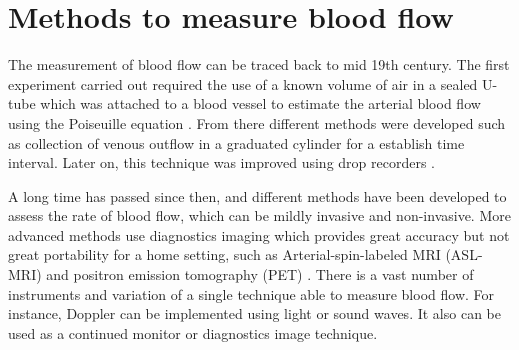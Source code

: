 %


\section{Methods to measure blood flow }
The measurement of blood flow can be traced back to mid 19th century. The first experiment carried out required the use of a known volume of air in a sealed U-tube which was attached to a blood vessel to estimate the arterial blood flow using the Poiseuille equation \cite{dokunin1958modification}. From there different methods were developed such as collection of venous outflow in a graduated cylinder for a establish time interval. Later on, this technique was improved using drop recorders \cite{jayanthy2011measuring}.

A long time has passed since then, and different methods have been developed to assess the rate of blood flow, which can be mildly invasive and non-invasive. More advanced methods use diagnostics imaging which provides great accuracy but not great portability for a home setting, such as Arterial-spin-labeled MRI (ASL-MRI) \cite{schmitt2003quantitative} and positron emission tomography (PET) \cite{baron1999mapping}. There is a vast number of instruments and variation of a single technique able to measure blood flow. For instance, Doppler can be implemented using light or sound waves. It also can be used as a continued monitor or diagnostics image technique. 

